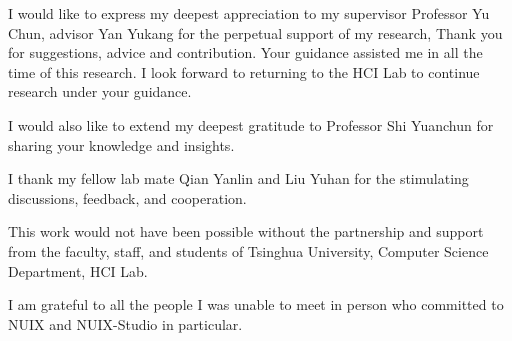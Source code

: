 \begin{acknowledgements}

  I would like to express my deepest appreciation to my supervisor Professor Yu Chun, advisor Yan Yukang for the perpetual support of my research, Thank you for suggestions, advice and contribution. Your guidance assisted me in all the time of this research. I look forward to returning to the HCI Lab to continue research under your guidance. 
  
  I would also like to extend my deepest gratitude to Professor Shi Yuanchun for sharing your knowledge and insights. 
  
  I thank my fellow lab mate Qian Yanlin and Liu Yuhan for the stimulating discussions, feedback, and cooperation.
  
  This work would not have been possible without the partnership and support from the faculty, staff, and students of Tsinghua University, Computer Science Department, HCI Lab. 
  
  I am grateful to all the people I was unable to meet in person who committed to NUIX and NUIX-Studio in particular.
  
\end{acknowledgements}
